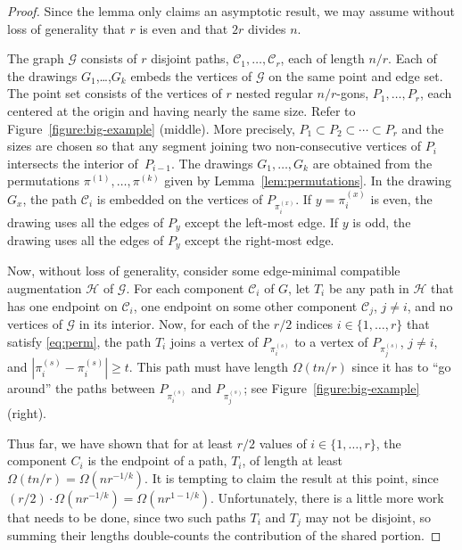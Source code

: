 \documentclass{patmorin}
\begin{document}
\begin{proof}
Since the lemma only claims an asymptotic result, we may assume without
loss of generality that $r$ is even and that $2r$ divides $n$.

The graph $\mathcal G$ consists of $r$ disjoint paths,
$\mathcal{C}_1,\ldots,\mathcal{C}_r$, each of length $n/r$.  Each of the
drawings $G_1$,\ldots,$G_k$ embeds the vertices of $\mathcal G$ on the
same point and edge set. The point set consists of the vertices of
$r$ nested regular $n/r$-gons, $P_1,\ldots,P_r$, each centered at the
origin and having nearly the same size. Refer to Figure~\ref{figure:big-example} (middle). More precisely, $P_1\subset
P_2\subset\cdots\subset P_r$ and the sizes are chosen so that any segment
joining two non-consecutive vertices of $P_i$ intersects the interior
of~$P_{i-1}$.
The drawings $G_1,\ldots,G_k$ are obtained from the permutations
$\pi^{(1)},\ldots,\pi^{(k)}$ given by \linebreak Lemma~\ref{lem:permutations}.
In the drawing $G_x$, the path $\mathcal C_i$ is embedded on the vertices
of $P_{\pi^{(x)}_i}$. If $y=\pi^{(x)}_i$ is even, the drawing uses
all the edges of $P_y$ except the left-most edge.  If $y$ is odd, the
drawing uses all the edges of $P_y$ except the right-most edge.

Now, without loss of generality, consider some edge-minimal compatible
augmentation $\mathcal H$ of $\mathcal G$.  For each component
$\mathcal{C}_i$ of $G$, let $T_i$ be any path in $\mathcal H$ that has
one endpoint on $\mathcal C_i$, one endpoint on some other component
$\mathcal{C}_j$, $j\neq i$, and no vertices of $\mathcal G$ in its
interior.
Now, for each of the $r/2$ indices $i\in\{1,\ldots,r\}$ that satisfy
\eqref{eq:perm}, the path $T_i$ joins a vertex of
$P_{\pi^{(s)}_i}$ to a vertex of $P_{\pi^{(s)}_j}$, $j\neq
i$, and $|\pi^{(s)}_i-\pi^{(s)}_i|\ge t$.  This path must
have length $\Omega(tn/r)$ since it has to ``go around'' the
paths between $P_{\pi^{(s)}_i}$ and $P_{\pi^{(s)}_j}$; see
Figure~\ref{figure:big-example} (right).

Thus far, we have shown that for at least $r/2$ values of
$i\in\{1,\ldots,r\}$, the component $C_i$ is the endpoint of a
path, $T_i$, of length at least $\Omega(tn/r)=\Omega(nr^{-1/k})$.
It is tempting to claim the result at this point, since
$(r/2)\cdot\Omega(nr^{-1/k})=\Omega(nr^{1-1/k})$. Unfortunately, there
is a little more work that needs to be done, since two such paths $T_i$
and $T_j$ may not be disjoint, so summing their lengths double-counts
the contribution of the shared portion.


\end{proof}
\end{document}
